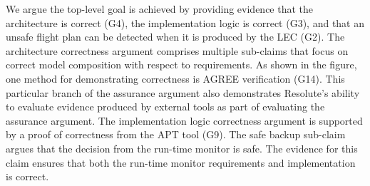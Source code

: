 We argue the top-level goal is achieved by providing evidence that the architecture is correct (G4), the implementation logic is correct (G3), and that an unsafe flight plan can be detected when it is produced by the LEC (G2).  The architecture correctness argument comprises multiple sub-claims that focus on correct model composition with respect to requirements.  As shown in the figure, one method for demonstrating correctness is AGREE verification (G14).  This particular branch of the assurance argument also demonstrates Resolute's ability to evaluate evidence produced by external tools as part of evaluating the assurance argument.
%
The implementation logic correctness argument is supported by a proof of correctness from the APT tool (G9). The safe backup sub-claim argues that the decision from the run-time monitor is safe. The evidence for this claim ensures that both the run-time monitor requirements and implementation is correct. 


